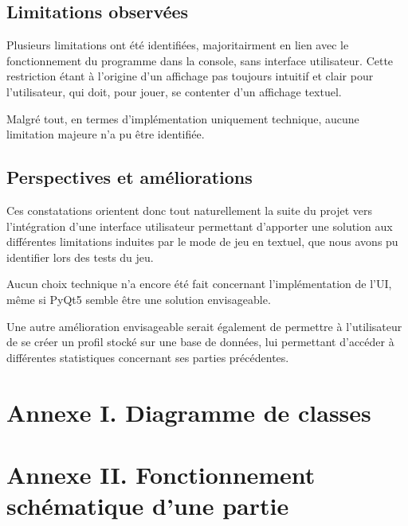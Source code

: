    \subsection{Limitations observées}
   Plusieurs limitations ont été identifiées, majoritairment en lien avec le fonctionnement du programme dans la console, sans interface utilisateur.
      Cette restriction étant à l'origine d'un affichage pas toujours intuitif et clair pour l'utilisateur, qui doit, pour jouer, se contenter d'un affichage textuel.

      Malgré tout, en termes d'implémentation uniquement technique, aucune limitation majeure n'a pu être identifiée.
   
   \subsection{Perspectives et améliorations}
      Ces constatations orientent donc tout naturellement la suite du projet vers l'intégration d'une interface utilisateur permettant d'apporter une solution aux différentes limitations induites par le mode de jeu en textuel, que nous avons pu identifier lors des tests du jeu.

      Aucun choix technique n'a encore été fait concernant l'implémentation de l'UI, même si PyQt5 semble être une solution envisageable.

      Une autre amélioration envisageable serait également de permettre à l'utilisateur de se créer un profil stocké sur une base de données, lui permettant d'accéder à différentes statistiques concernant ses parties précédentes.

\newpage

\section*{Annexe I. Diagramme de classes}

\newpage

\section*{Annexe II. Fonctionnement schématique d'une partie}

